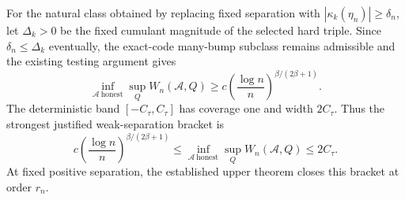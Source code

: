 For the natural class obtained by replacing fixed separation with \(|\kappa_k(\eta_n)|\ge\delta_n\), let \(\Delta_k>0\) be the fixed cumulant magnitude of the selected hard triple.  Since \(\delta_n\le\Delta_k\) eventually, the exact-code many-bump subclass remains admissible and the existing testing argument gives
\[
 \inf_{\mathcal A\ \mathrm{honest}}\sup_Q W_n(\mathcal A,Q)
 \ge c\left(\frac{\log n}{n}\right)^{\beta/(2\beta+1)}.
\]
The deterministic band \([-C_\tau,C_\tau]\) has coverage one and width \(2C_\tau\).  Thus the strongest justified weak-separation bracket is
\[
 c\left(\frac{\log n}{n}\right)^{\beta/(2\beta+1)}
 \le\inf_{\mathcal A\ \mathrm{honest}}\sup_Q W_n(\mathcal A,Q)
 \le2C_\tau.
\]
At fixed positive separation, the established upper theorem closes this bracket at order \(r_n\).